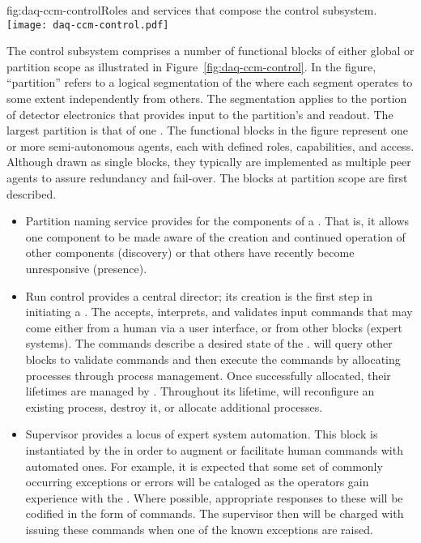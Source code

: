 \begin{dunefigure}{fig:daq-ccm-control}{Roles and services that compose the  control subsystem.}
  \texttt{[image: daq-ccm-control.pdf]}
\end{dunefigure}

The control subsystem comprises a number of functional blocks of either global or partition scope as illustrated in Figure~\ref{fig:daq-ccm-control}. 
In the figure, ``partition'' refers to a logical segmentation of the  where each segment operates to some extent independently from others. 
The segmentation applies to the portion of detector electronics that provides input to the partition's  and readout. 
The largest partition %
is that of one . 
The functional blocks in the figure represent one or more semi-autonomous agents, each with defined roles, capabilities, and access. 
Although drawn as single blocks, they typically are implemented as multiple peer agents to assure redundancy and fail-over. 
The blocks at partition scope are first described.

\begin{itemize}
\item Partition naming service provides  for the components of a . 
  That is, it allows one component to be made aware of the creation and continued operation of other components (discovery) or that others have recently become unresponsive (presence). 

\item Run control provides a central director;  its creation is the first step in initiating a . 
  The  accepts, interprets, and validates input commands that may come either from a human via a user interface, or from other blocks (expert systems). 
  The commands describe a desired state of the . 
   will query other blocks to validate commands and then execute the commands by allocating processes through process management. 
  Once successfully allocated, their lifetimes are managed by . 
  Throughout its lifetime,  will reconfigure an existing process, destroy it, or allocate additional processes. 

\item Supervisor provides a locus of expert system automation. 
  This block is instantiated by the  in order to augment or facilitate human commands with automated ones. 
  For example, it is expected that some set of commonly occurring exceptions or errors will be cataloged as the operators gain experience with the .   Where possible, appropriate responses to these will be codified in the form of  commands.  The supervisor then will be charged with issuing these commands when one of the known exceptions are raised.

\end{itemize}

